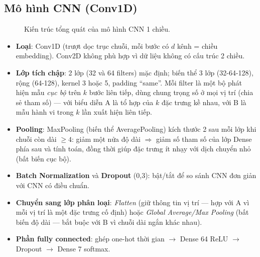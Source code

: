 \subsection{Mô hình CNN (Conv1D)}

\begin{figure}[H]\centering
{}
\caption{Kiến trúc tổng quát của mô hình CNN 1 chiều.}\label{fig:cnn}
\end{figure}

\begin{itemize}
\item \textbf{Loại}: Conv1D (trượt dọc trục chuỗi, mỗi bước có $d$ kênh = chiều embedding). Conv2D không phù hợp vì dữ liệu không có
  cấu trúc 2 chiều.
\item \textbf{Lớp tích chập}: 2 lớp (32 và 64 filters) mặc định; biến thể 3 lớp (32-64-128), rộng (64-128), kernel 3 hoặc 5,
  padding ``same''. Mỗi filter là một bộ phát hiện mẫu \emph{cục bộ} trên $k$ bước liên tiếp, dùng chung trọng số ở mọi vị trí
  (chia sẻ tham số) --- với biểu diễn A là tổ hợp của $k$ đặc trưng kề nhau, với B là mẫu hành vi trong $k$ lần xuất hiện liên tiếp.
\item \textbf{Pooling}: MaxPooling (biến thể AveragePooling) kích thước 2 sau mỗi lớp khi chuỗi còn dài $\ge 4$:
  giảm một nửa độ dài $\Rightarrow$ giảm số tham số của lớp Dense phía sau và tính toán, đồng thời giúp đặc trưng ít nhạy với
  dịch chuyển nhỏ (bất biến cục bộ).
\item \textbf{Batch Normalization} và \textbf{Dropout} (0,3): bật/tắt để so sánh CNN đơn giản với CNN có điều chuẩn.
\item \textbf{Chuyển sang lớp phân loại}: \emph{Flatten} (giữ thông tin vị trí --- hợp với A vì mỗi vị trí là một đặc trưng cố định)
  hoặc \emph{Global Average/Max Pooling} (bất biến độ dài --- bắt buộc với B vì chuỗi dài ngắn khác nhau).
\item \textbf{Phần fully connected}: ghép one-hot thời gian $\to$ Dense 64 ReLU $\to$ Dropout $\to$ Dense 7 softmax.
\end{itemize}

